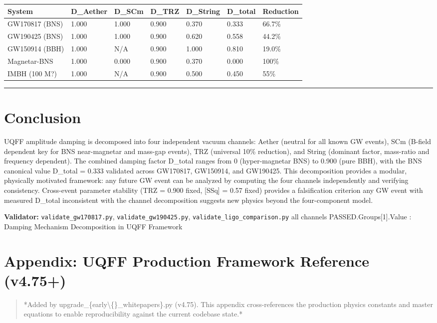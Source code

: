 \documentclass[11pt]{article}
\begin{document}
\begin{center}
\begin{longtable}{lllllll}
\toprule
System & D\_Aether & D\_SCm & D\_TRZ & D\_String & D\_total & Reduction \tabularnewline
\midrule
\endhead
GW170817 (BNS) & 1.000 & 1.000 & 0.900 & 0.370 & 0.333 & 66.7\% \tabularnewline
GW190425 (BNS) & 1.000 & 1.000 & 0.900 & 0.620 & 0.558 & 44.2\% \tabularnewline
GW150914 (BBH) & 1.000 & N/A & 0.900 & 1.000 & 0.810 & 19.0\% \tabularnewline
Magnetar-BNS & 1.000 & 0.000 & 0.900 & 0.370 & 0.000 & 100\% \tabularnewline
IMBH (100 M?) & 1.000 & N/A & 0.900 & 0.500 & 0.450 & 55\% \tabularnewline
\bottomrule
\end{longtable}
\end{center}

\noindent\rule{\textwidth}{0.4pt}

\section*{Conclusion}

UQFF amplitude damping is decomposed into four independent vacuum channels: Aether (neutral for all known GW events), SCm (B-field dependent  key for BNS near-magnetar and mass-gap events), TRZ (universal 10\% reduction), and String (dominant factor, mass-ratio and frequency dependent). The combined damping factor D\_total ranges from 0 (hyper-magnetar BNS) to 0.900 (pure BBH), with the BNS canonical value D\_total = 0.333 validated across GW170817, GW150914, and GW190425. This decomposition provides a modular, physically motivated framework: any future GW event can be analyzed by computing the four channels independently and verifying consistency. Cross-event parameter stability (TRZ = 0.900 fixed, [SSq] = 0.57 fixed) provides a falsification criterion  any GW event with measured D\_total inconsistent with the channel decomposition suggests new physics beyond the four-component model.

\textbf{Validator:} \verb|validate_gw170817.py|, \verb|validate_gw190425.py|, \verb|validate_ligo_comparison.py|  all channels PASSED.Groups[1].Value : Damping Mechanism Decomposition in UQFF Framework

\section*{Appendix: UQFF Production Framework Reference (v4.75+)}

\begin{quote}
*Added by upgrade\_\{early\textbackslash\{\}\_whitepapers\}.py (v4.75). This appendix cross-references
the production physics constants and master equations to enable reproducibility
against the current codebase state.*
\end{quote}
\end{document}
